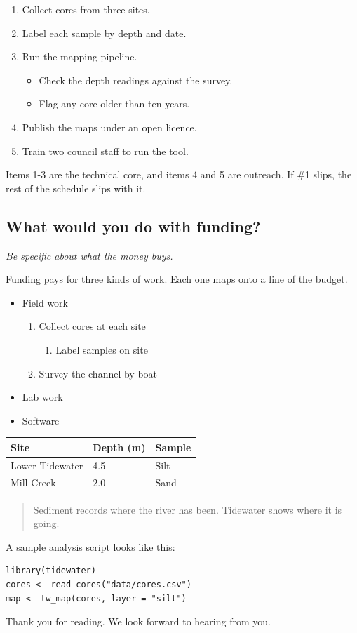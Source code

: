 \begin{enumerate}
  \item Collect cores from three sites.
  \item Label each sample by depth and date.
  \item Run the mapping pipeline.
  \begin{itemize}
    \item Check the depth readings against the survey.
    \item Flag any core older than ten years.
  \end{itemize}
  \item Publish the maps under an open licence.
  \item Train two council staff to run the tool.
\end{enumerate}

Items 1-3 are the technical core, and items 4 and 5 are outreach. If \#1 slips, the rest of the schedule slips with it.

\subsection{What would you do with funding?}

\emph{Be specific about what the money buys.}

Funding pays for three kinds of work. Each one maps onto a line of the budget.

\begin{itemize}
  \item Field work
  \begin{enumerate}
    \item Collect cores at each site
    \begin{enumerate}
      \item Label samples on site
    \end{enumerate}
    \item Survey the channel by boat
  \end{enumerate}
  \item Lab work
  \item Software
\end{itemize}

\begin{tabular}{l l l}
Site & Depth (m) & Sample \\
\hline
Lower Tidewater & 4.5 & Silt \\
Mill Creek & 2.0 & Sand \\
\end{tabular}

\begin{quote}
Sediment records where the river has been. Tidewater shows where it is going.
\end{quote}

A sample analysis script looks like this:

\begin{verbatim}
library(tidewater)
cores <- read_cores("data/cores.csv")
map <- tw_map(cores, layer = "silt")
\end{verbatim}

Thank you for reading. We look forward to hearing from you.
